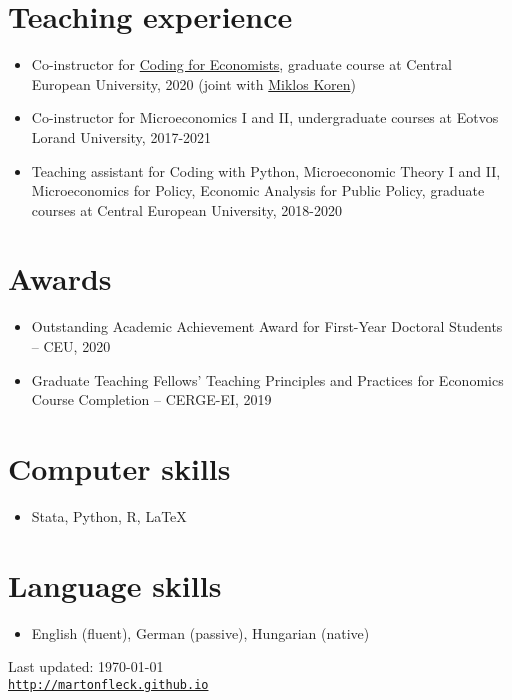 \documentclass[a4paper,11pt]{article}
\begin{document}
\section*{Teaching experience}
\begin{itemize}
  \item Co-instructor for \href{https://ceu-economics-and-business.github.io/2020-11-10-ECBS-5241-Coding-for-Economists/}{Coding for Economists}, graduate course at Central European University, 2020 (joint with \href{https://koren.mk}{Miklos Koren})
  \item Co-instructor for Microeconomics I and II, undergraduate courses at Eotvos Lorand University, 2017-2021
  \item Teaching assistant for Coding with Python, Microeconomic Theory I and II, Microeconomics for Policy, Economic Analysis for Public Policy, graduate courses at Central European University, 2018-2020
\end{itemize}

\section*{Awards}
\begin{itemize}
\item Outstanding Academic Achievement Award for First-Year Doctoral Students – CEU, 2020
\item Graduate Teaching Fellows’ Teaching Principles and Practices for Economics Course Completion – CERGE-EI, 2019
\end{itemize}

\section*{Computer skills}
\begin{itemize}
\item Stata, Python, R, \LaTeX
\end{itemize}

\section*{Language skills}
\begin{itemize}
\item English (fluent), German (passive), Hungarian (native)
\end{itemize}

\begin{center}
\begin{footnotesize}
Last updated: \today \\
\href{http://martonfleck.github.io}{\tt http://martonfleck.github.io}
\end{footnotesize}
\end{center}
\end{document}
